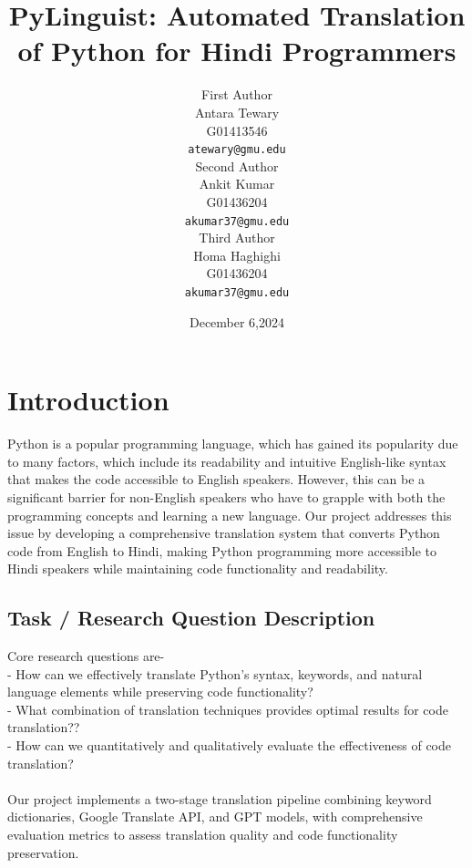 \documentclass[11pt,a4paper]{article}
\title{PyLinguist: Automated Translation of Python for Hindi Programmers}
\author{First Author \\
  Antara Tewary\\ 
  G01413546\\
  \texttt{atewary@gmu.edu} \\\And
  Second Author \\
  Ankit Kumar\\ 
  G01436204\\
  \texttt{akumar37@gmu.edu}\\\And
  Third Author \\
  Homa Haghighi\\ 
  G01436204\\
  \texttt{akumar37@gmu.edu}}
\date{December 6,2024}
\begin{document}
\maketitle

\section{Introduction}
Python is a popular programming language, which has gained its popularity due to many factors, which include its readability and intuitive English-like syntax that makes the code accessible to English speakers. However, this can be a significant barrier for non-English speakers who have to grapple with both the programming concepts and learning a new language. Our project addresses this issue by developing a comprehensive translation system that converts Python code from English to Hindi, making Python programming more accessible to Hindi speakers while maintaining code functionality and readability.
            \subsection{Task / Research Question Description} 
            Core research questions are-\\
            - How can we effectively translate Python's syntax, keywords, and natural language elements while preserving code functionality?\\
            - What combination of translation techniques provides optimal results for code translation??\\
            - How can we quantitatively and qualitatively evaluate the effectiveness of code translation?\\ \\
            Our project implements a two-stage translation pipeline combining keyword dictionaries, Google Translate API, and GPT models, with comprehensive evaluation metrics to assess translation quality and code functionality preservation.
\end{document}
